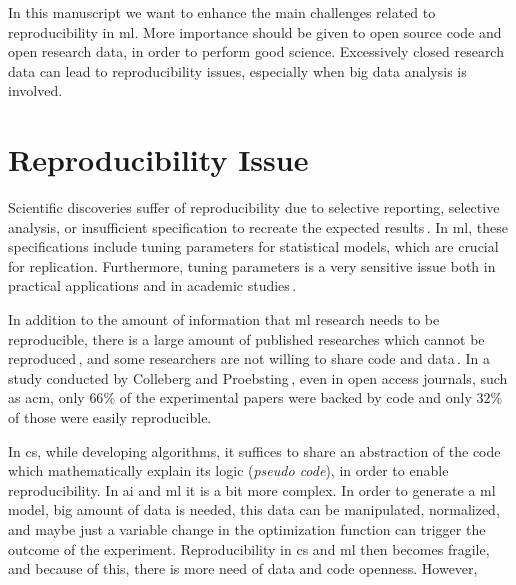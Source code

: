 In this manuscript we want to enhance the main challenges related to reproducibility
in \ac{ml}. More importance should be given to open source
code and open research data, in order to perform good science.
Excessively closed research data can lead to reproducibility issues,
especially when big data analysis is involved.

\section{Reproducibility Issue}
Scientific discoveries suffer of reproducibility due
to selective reporting, selective analysis, or insufficient specification to recreate the
expected results\,\cite{aarts2016reproducibility}. 
In \ac{ml}, these specifications include tuning parameters for statistical models, which are crucial
for replication. Furthermore, tuning parameters
is a very sensitive issue both in practical applications and in academic studies\,\cite{birattari2004problem}.

In addition to the amount of information that \ac{ml} research needs to be reproducible,
there is a large amount of published researches which cannot be
reproduced\,\cite{begley2012drug, begley2015reproducibility, prinz2011believe},
and some researchers are not willing to share code and data\,\cite{gundersen2018state}.
In a study conducted by Colleberg and Proebsting\,\cite{Collberg:2016:RCS:2897191.2812803},
even in open access journals, such as \ac{acm}, only $66\%$ of the experimental papers
were backed by code and only $32\%$ of those were easily reproducible.

In \ac{cs}, while developing algorithms, it suffices to share an abstraction of the code which
mathematically explain its logic (\emph{pseudo code}),
in order to enable reproducibility. In \ac{ai} and \ac{ml} it is a bit more complex. In order to
generate a \ac{ml} model, big amount of data is needed, 
this data can be manipulated, normalized, and maybe just a variable
change in the optimization function can trigger the outcome
of the experiment. Reproducibility in \ac{cs} and \ac{ml}
then becomes fragile, and because of this,
there is more need of data and code openness. However,


